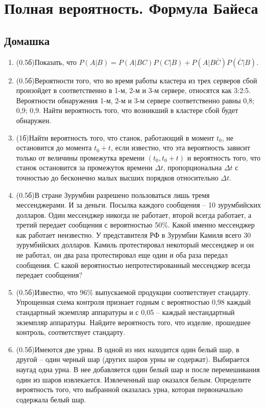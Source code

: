\documentclass[a4paper, 14pt]{extarticle}
\begin{document}
\newpage

\section*{Полная вероятность. Формула Байеса}
\subsection*{Домашка}
\begin{enumerate}
\item (0.5б)Показать, что
	$P(A|B) =P(A|BC)P(C|B)+P(A|B\overline{C})P(\overline{C}|B).$

	\item (0.5б)Вероятности того, что во время работы кластера из трех серверов сбой произойдет в соответственно в 1-м, 2-м и 3-м сервере, относятся как 3:2:5. Вероятности обнаружения
	1-м, 2-м и 3-м сервере соответственно равны 0,8; 0,9;
	0,9. Найти вероятность того, что возникший в кластере
	сбой будет обнаружен.
	\item (1б)Найти вероятность того, что станок, работающий в 
	момент $t_0$, не остановится до момента $t_0+t$, если известно, что
	эта вероятность зависит только от величины промежутка времени
	$(t_0,t_0+t)$ и 
	 вероятность того, что станок остановится за промежуток времени
	$\Delta t$, пропорциональна $\Delta t$ с точностью до бесконечно малых высших
	порядков относительно $\Delta t$.	
	
	\item (0.5б)В стране Зурумбии разрешено пользоваться лишь тремя мессенджерами. И за деньги. Посылка каждого сообщения -- 10 зурумбийских долларов. Один мессенджер никогда не работает, второй всегда работает, а третий передает сообщения с вероятностью 50\%. Какой именно мессенджер как работает неизвестно. У представителя РФ  в Зурумбии Камиля всего 30 зурумбийских долларов. Камиль протестировал некоторый мессенджер и он не работал, он два раза протестировал еще один и  оба раза передал сообщения. С какой вероятностью непротестированный мессенджер  всегда передает сообщения?
	
	\item (0.5б)Известно, что 96\% выпускаемой продукции соответствует стандарту. Упрощенная схема контроля признает годным с вероятностью
	0,98 каждый стандартный экземпляр аппаратуры и с 
	0,05 – каждый нестандартный экземпляр аппаратуры. Найдите вероятность того, что изделие, прошедшее контроль, соответствует стандарту.


	\item (0.5б)Имеются две урны. В одной из них находится один белый шар, в
	другой – один черный шар (других шаров урны не содержат). Выбирается наугад одна урна. В нее добавляется один белый шар и после перемешивания один из шаров извлекается. Извлеченный шар оказался
	белым. Определите вероятность того, что выбранной
	оказалась урна, которая первоначально содержала белый шар.
	

\end{enumerate}
\end{document}
